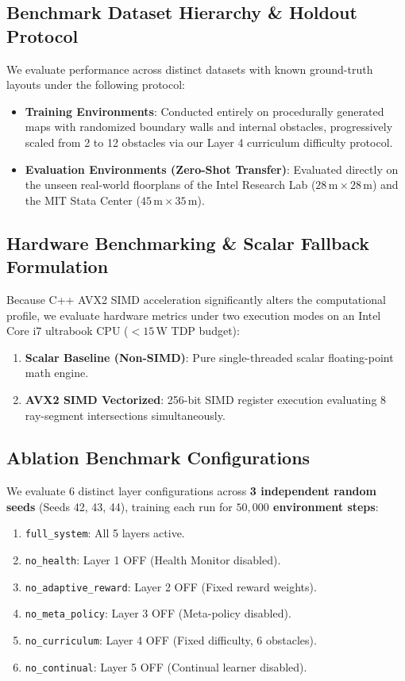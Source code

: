\documentclass[11pt,a4paper]{article}
\begin{document}
\subsection{Benchmark Dataset Hierarchy \& Holdout Protocol}

We evaluate performance across distinct datasets with known ground-truth layouts under the following protocol:
\begin{itemize}
    \item \textbf{Training Environments}: Conducted entirely on procedurally generated maps with randomized boundary walls and internal obstacles, progressively scaled from 2 to 12 obstacles via our Layer 4 curriculum difficulty protocol.
    \item \textbf{Evaluation Environments (Zero-Shot Transfer)}: Evaluated directly on the unseen real-world floorplans of the Intel Research Lab ($28\,\text{m} \times 28\,\text{m}$) and the MIT Stata Center ($45\,\text{m} \times 35\,\text{m}$).
\end{itemize}

\subsection{Hardware Benchmarking \& Scalar Fallback Formulation}

Because C++ AVX2 SIMD acceleration significantly alters the computational profile, we evaluate hardware metrics under two execution modes on an Intel Core i7 ultrabook CPU ($<15\,\text{W}$ TDP budget):
\begin{enumerate}
    \item \textbf{Scalar Baseline (Non-SIMD)}: Pure single-threaded scalar floating-point math engine.
    \item \textbf{AVX2 SIMD Vectorized}: 256-bit SIMD register execution evaluating 8 ray-segment intersections simultaneously.
\end{enumerate}

\subsection{Ablation Benchmark Configurations}

We evaluate 6 distinct layer configurations across \textbf{3 independent random seeds} (Seeds 42, 43, 44), training each run for \textbf{$50,000$ environment steps}:

\begin{enumerate}
    \item \texttt{full\_system}: All 5 layers active.
    \item \texttt{no\_health}: Layer 1 OFF (Health Monitor disabled).
    \item \texttt{no\_adaptive\_reward}: Layer 2 OFF (Fixed reward weights).
    \item \texttt{no\_meta\_policy}: Layer 3 OFF (Meta-policy disabled).
    \item \texttt{no\_curriculum}: Layer 4 OFF (Fixed difficulty, 6 obstacles).
    \item \texttt{no\_continual}: Layer 5 OFF (Continual learner disabled).
\end{enumerate}
\end{document}
